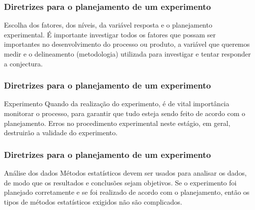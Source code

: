 \documentclass[14pt,aspectratio=1610]{beamer}
\begin{document}
\begin{frame}{}
\frametitle{Diretrizes para o planejamento de um experimento}
\begin{block}{Escolha dos fatores, dos níveis, da variável resposta e o planejamento experimental.}
\justifying
É importante investigar todos os fatores que possam ser importantes no desenvolvimento do processo ou produto, a variável que queremos medir e o delineamento 
(metodologia) utilizada para investigar e tentar responder a conjectura.
\end{block}
\end{frame}



\begin{frame}{}
\frametitle{Diretrizes para o planejamento de um experimento}
\begin{block}{Experimento}
\justifying
Quando da realização do experimento, é de vital importância monitorar o processo, para garantir que tudo esteja sendo feito de acordo com o planejamento. Erros no 
procedimento experimental neste estágio, em geral, destruirão a validade do experimento.
\end{block}
\end{frame}

\begin{frame}{}
\frametitle{Diretrizes para o planejamento de um experimento}
\begin{block}{Análise dos dados}
\justifying
Métodos estatísticos devem ser usados para analisar os dados, de modo que os resultados e conclusões sejam objetivos. Se o experimento foi planejado corretamente 
e se foi realizado de acordo com o planejamento, então os tipos de métodos estatísticos exigidos não são
complicados.
\end{block}
\end{frame}
\end{document}
